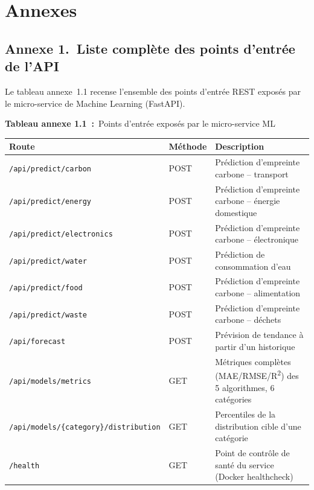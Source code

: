 \chapter*{Annexes}

\section*{Annexe 1.~Liste complète des points d'entrée de l'API}


Le tableau annexe~1.1 recense l'ensemble des points d'entrée REST exposés par le micro-service de Machine Learning (FastAPI).

{\raggedright \textbf{Tableau annexe 1.1~:}~Points d'entrée exposés par le micro-service ML}
\begin{longtable}[c]{
    | p{}
    | p{}
    | p{} |
}
    \hline
    \textbf{Route} & \textbf{Méthode} & \textbf{Description} \\ \hline
    \endhead
    \texttt{/api/predict/carbon} & POST & Prédiction d'empreinte carbone -- transport \\ \hline
    \texttt{/api/predict/energy} & POST & Prédiction d'empreinte carbone -- énergie domestique \\ \hline
    \texttt{/api/predict/electronics} & POST & Prédiction d'empreinte carbone -- électronique \\ \hline
    \texttt{/api/predict/water} & POST & Prédiction de consommation d'eau \\ \hline
    \texttt{/api/predict/food} & POST & Prédiction d'empreinte carbone -- alimentation \\ \hline
    \texttt{/api/predict/waste} & POST & Prédiction d'empreinte carbone -- déchets \\ \hline
    \texttt{/api/forecast} & POST & Prévision de tendance à partir d'un historique \\ \hline
    \texttt{/api/models/metrics} & GET & Métriques complètes (MAE/RMSE/R\textsuperscript{2}) des 5 algorithmes, 6 catégories \\ \hline
    \texttt{/api/models/\{category\}/distribution} & GET & Percentiles de la distribution cible d'une catégorie \\ \hline
    \texttt{/health} & GET & Point de contrôle de santé du service (Docker healthcheck) \\ \hline
\end{longtable}

